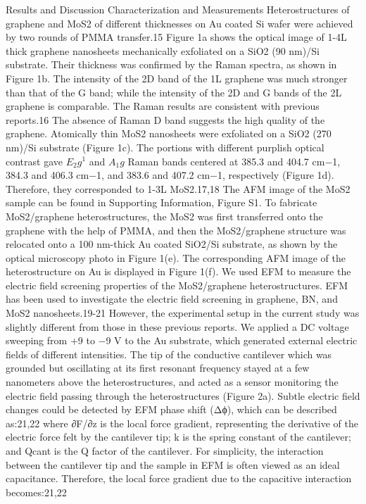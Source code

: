 Results and Discussion
Characterization and Measurements
Heterostructures of graphene and MoS2 of different thicknesses on Au coated Si wafer were achieved by two rounds of PMMA transfer.15 Figure 1a shows the optical image of 1-4L thick graphene nanosheets mechanically exfoliated on a SiO2 (90 nm)/Si substrate. Their thickness was confirmed by the Raman spectra, as shown in Figure 1b. The intensity of the 2D band of the 1L graphene was much stronger than that of the G band; while the intensity of the 2D and G bands of the 2L graphene is comparable. The Raman results are consistent with previous reports.16 The absence of Raman D band suggests the high quality of the graphene. Atomically thin MoS2 nanosheets were exfoliated on a SiO2 (270 nm)/Si substrate (Figure 1c). The portions with different purplish optical contrast gave $E_2g^1$ and $A_1g$ Raman bands centered at 385.3 and 404.7 cm−1, 384.3 and 406.3 cm−1, and 383.6 and 407.2 cm−1, respectively (Figure 1d). Therefore, they corresponded to 1-3L MoS2.17,18 The AFM image of the MoS2 sample can be found in Supporting Information, Figure S1. To fabricate MoS2/graphene heterostructures, the MoS2 was first transferred onto the graphene with the help of PMMA, and then the MoS2/graphene structure was relocated onto a 100 nm-thick Au coated SiO2/Si substrate, as shown by the optical microscopy photo in Figure 1(e). The corresponding AFM image of the heterostructure on Au is displayed in Figure 1(f).
We used EFM to measure the electric field screening properties of the MoS2/graphene heterostructures. EFM has been used to investigate the electric field screening in graphene, BN, and MoS2 nanosheets.19-21 However, the experimental setup in the current study was slightly different from those in these previous reports. We applied a DC voltage sweeping from +9 to −9 V to the Au substrate, which generated external electric fields of different intensities. The tip of the conductive cantilever which was grounded but oscillating at its first resonant frequency stayed at a few nanometers above the heterostructures, and acted as a sensor monitoring the electric field passing through the heterostructures (Figure 2a). Subtle electric field changes could be detected by EFM phase shift (Δϕ), which can be described as:21,22
where ∂F/∂z is the local force gradient, representing the derivative of the electric force felt by the cantilever tip; k is the spring constant of the cantilever; and Qcant is the Q factor of the cantilever. For simplicity, the interaction between the cantilever tip and the sample in EFM is often viewed as an ideal capacitance. Therefore, the local force gradient due to the capacitive interaction becomes:21,22
